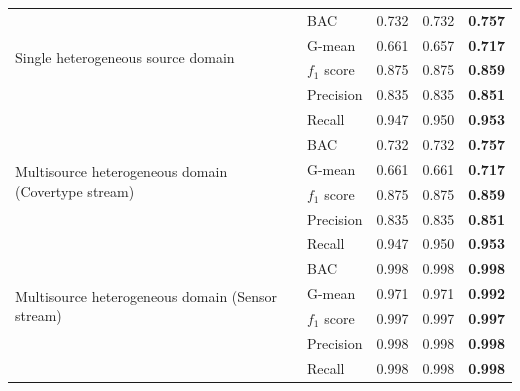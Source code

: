 \begin{table}[H]
{\begin{tabular}{|l|l|c|c|c|}
  \multirow{4}{*}{Single heterogeneous source domain} & BAC         & 0.732          & 0.732         & \textbf{0.757} \\ \cline{2-5} 
                                                 & G-mean          & 0.661          & 0.657         & \textbf{0.717} \\ \cline{2-5} 
                                                 & $f_1$ score        & 0.875          & 0.875         & \textbf{0.859} \\ \cline{2-5} 
                                                 & Precision       & 0.835          & 0.835         & \textbf{0.851} \\ \cline{2-5} 
                                                 & Recall          & 0.947          & 0.950         & \textbf{0.953} \\ \hline
  \multirow{4}{*}{Multisource heterogeneous domain (Covertype stream)} & BAC & 0.732  & 0.732         & \textbf{0.757} \\ \cline{2-5} 
                                                 & G-mean          & 0.661          & 0.661         & \textbf{0.717} \\ \cline{2-5} 
                                                 & $f_1$ score        & 0.875          & 0.875         & \textbf{0.859} \\ \cline{2-5} 
                                                 & Precision       & 0.835          & 0.835         & \textbf{0.851} \\ \cline{2-5} 
                                                 & Recall          & 0.947          & 0.950         & \textbf{0.953} \\ \hline
  \multirow{4}{*}{Multisource heterogeneous domain (Sensor stream)} & BAC & 0.998  & 0.998         & \textbf{0.998} \\ \cline{2-5} 
                                                 & G-mean          & 0.971          & 0.971         & \textbf{0.992} \\ \cline{2-5} 
                                                 & $f_1$ score        & 0.997          & 0.997         & \textbf{0.997} \\ \cline{2-5} 
                                                 & Precision       & 0.998          & 0.998         & \textbf{0.998} \\ \cline{2-5} 
                                                 & Recall          & 0.998          & 0.998         & \textbf{0.998} \\ \hline
  \end{tabular}
  }

  \label{table:6_table2}
  \end{table}

